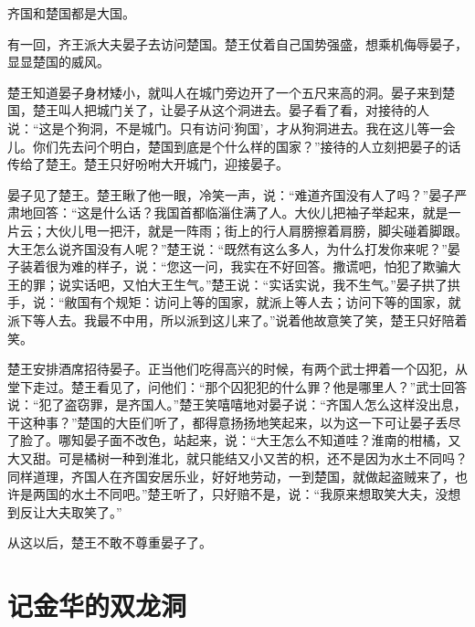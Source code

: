 \documentclass[12pt,UTF-8,openany]{ctexbook}
\begin{document}
\begin{large}
    
    齐国和楚国都是大国。
    
    有一回，齐王派大夫晏子去访问楚国。楚王仗着自己国势强盛，想乘机侮辱晏子，显显楚国的威风。
    
    楚王知道晏子身材矮小，就叫人在城门旁边开了一个五尺来高的洞。晏子来到楚国，楚王叫人把城门关了，让晏子从这个洞进去。晏子看了看，对接待的人说：“这是个狗洞，不是城门。只有访问‘狗国’，才从狗洞进去。我在这儿等一会儿。你们先去问个明白，楚国到底是个什么样的国家？”接待的人立刻把晏子的话传给了楚王。楚王只好吩咐大开城门，迎接晏子。
    
    晏子见了楚王。楚王瞅了他一眼，冷笑一声，说：“难道齐国没有人了吗？”晏子严肃地回答：“这是什么话？我国首都临淄住满了人。大伙儿把袖子举起来，就是一片云；大伙儿甩一把汗，就是一阵雨；街上的行人肩膀擦着肩膀，脚尖碰着脚跟。大王怎么说齐国没有人呢？”楚王说：“既然有这么多人，为什么打发你来呢？”晏子装着很为难的样子，说：“您这一问，我实在不好回答。撒谎吧，怕犯了欺骗大王的罪；说实话吧，又怕大王生气。”楚王说：“实话实说，我不生气。”晏子拱了拱手，说：“敝国有个规矩：访问上等的国家，就派上等人去；访问下等的国家，就派下等人去。我最不中用，所以派到这儿来了。”说着他故意笑了笑，楚王只好陪着笑。
    
    楚王安排酒席招待晏子。正当他们吃得高兴的时候，有两个武士押着一个囚犯，从堂下走过。楚王看见了，问他们：“那个囚犯犯的什么罪？他是哪里人？”武士回答说：“犯了盗窃罪，是齐国人。”楚王笑嘻嘻地对晏子说：“齐国人怎么这样没出息，干这种事？”楚国的大臣们听了，都得意扬扬地笑起来，以为这一下可让晏子丢尽了脸了。哪知晏子面不改色，站起来，说：“大王怎么不知道哇？淮南的柑橘，又大又甜。可是橘树一种到淮北，就只能结又小又苦的枳，还不是因为水土不同吗？同样道理，齐国人在齐国安居乐业，好好地劳动，一到楚国，就做起盗贼来了，也许是两国的水土不同吧。”楚王听了，只好赔不是，说：“我原来想取笑大夫，没想到反让大夫取笑了。”
    
    从这以后，楚王不敢不尊重晏子了。
    
\end{large}



\chapter{记金华的双龙洞}
\end{document}
